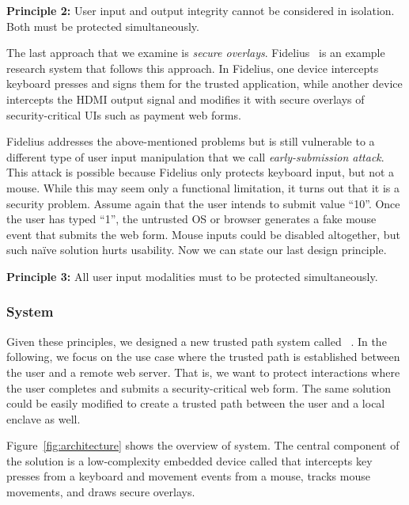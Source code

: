 \begin{tcolorbox}
\textbf{Principle 2:} User input and output integrity cannot be considered in isolation. Both must be protected simultaneously.
\end{tcolorbox}

The last approach that we examine is \emph{secure overlays}. Fidelius~\cite{Fidelius} is an example research system that follows this approach. In Fidelius, one device intercepts keyboard presses and signs them for the trusted application, while another device intercepts the HDMI output signal and modifies it with secure overlays of security-critical UIs such as payment web forms. 

Fidelius addresses the above-mentioned problems but is still vulnerable to a different type of user input manipulation that we call \emph{early-submission attack}. This attack is possible because Fidelius only protects keyboard input, but not a mouse. While this may seem only a functional limitation, it turns out that it is a security problem. Assume again that the user intends to submit value ``10''. Once the user has typed ``1'', the untrusted OS or browser generates a fake mouse event that submits the web form. Mouse inputs could be disabled altogether, but such na\"ive solution hurts usability. Now we can state our last design principle.

\begin{tcolorbox}
\textbf{Principle 3:} All user input modalities must to be protected simultaneously.
\end{tcolorbox}


\subsubsection*{\protection System}

Given these principles, we designed a new trusted path system called \protection~\cite{protection}. In the following, we focus on the use case where the trusted path is established between the user and a remote web server. That is, we want to protect interactions where the user completes and submits a security-critical web form. The same solution could be easily modified to create a trusted path between the user and a local enclave as well.

Figure~\ref{fig:architecture} shows the overview of \protection system. The central component of the solution is a low-complexity embedded device called \hub that intercepts key presses from a keyboard and movement events from a mouse, tracks mouse movements, and draws secure overlays. 


